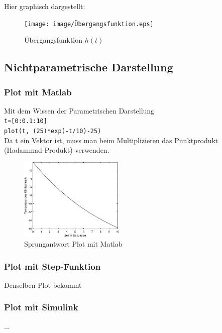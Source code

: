 Hier graphisch dargestellt:
\begin{figure}[H]
    \centering
    \texttt{[image: image/Übergangsfunktion.eps]}
    \caption{Übergangsfunktion $h(t)$}
\end{figure}


\subsection{Nichtparametrische Darstellung}
\subsubsection{Plot mit Matlab}

Mit dem Wissen der Parametrischen Darstellung\\ 
\texttt{t=[0:0.1:10]}\\
\texttt{plot(t, (25)*exp(-t/10)-25)}\\
Da t ein Vektor ist, muss man beim Multiplizieren das Punktprodukt (Hadammad-Produkt) verwenden.

        
%
                    
\begin{figure}[H]
    \centering
    \includegraphics[width=5cm]{image/PlotMitMatLab.eps}
    \caption{Sprungantwort Plot mit Matlab}
\end{figure}
\subsubsection{Plot mit Step-Funktion}
Denselben Plot bekommt
\subsubsection{Plot mit Simulink}
...